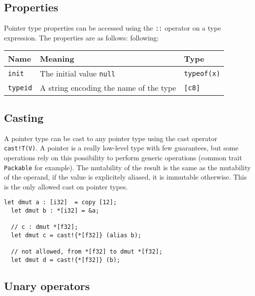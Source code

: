 \subsection {Properties}

Pointer type properties can be accessed using the \texttt{::} operator on a type
expression. The properties are as follows: following:

\begin{center}\begin{adjustbox}{max width=\linewidth}
  \begin{tabular}{|l|ll|}
    \hline
    Name & Meaning & Type\\
    \hline
    \hline
    \texttt{init} & The initial value \texttt{null} & \texttt{typeof(x)}\\
    \hline
    \texttt{typeid} & A string encoding the name of the type & \texttt{[c8]} \\
    \hline
  \end{tabular}
\end{adjustbox}\end{center}

\subsection {Casting}

A pointer type can be cast to any pointer type using the cast operator
\texttt{cast!T(V)}. A pointer is a really low-level type with few guarantees,
but some operations rely on this possibility to perform generic operations
(common trait \texttt{Packable} for example). The mutability of the result is
the same as the mutability of the operand, if the value is explicitely aliased,
it is immutable otherwise. This is the only allowed cast on pointer types.
\smallskip

\begin{lstlisting}[style=coloredverbatim]
  let dmut a : [i32]  = copy [12];
  let dmut b : *[i32] = &a;

  // c : dmut *[f32];
  let dmut c = cast!{*[f32]} (alias b);

  // not allowed, from *[f32] to dmut *[f32];
  let dmut d = cast!{*[f32]} (b);
\end{lstlisting}

\subsection {Unary operators}

